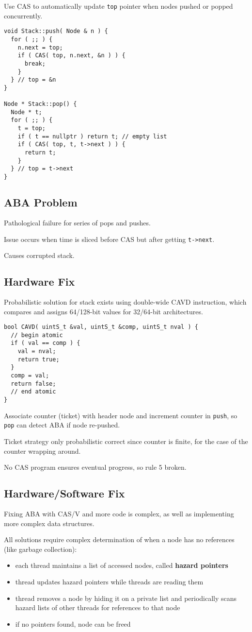 \documentclass[11pt]{article}
\begin{document}
Use CAS to automatically update \texttt{top} pointer when nodes pushed or popped concurrently.
\begin{verbatim}
void Stack::push( Node & n ) {
  for ( ;; ) {
    n.next = top;
    if ( CAS( top, n.next, &n ) ) {
      break;
    }
  } // top = &n
}

Node * Stack::pop() {
  Node * t;
  for ( ;; ) {
    t = top;
    if ( t == nullptr ) return t; // empty list
    if ( CAS( top, t, t->next ) ) {
      return t;
    }
  } // top = t->next
}
\end{verbatim}
\subsection{ABA Problem}
\label{sec:orgef9190d}
Pathological failure for series of pops and pushes.

Issue occurs when time is sliced before CAS but after getting \texttt{t->next}.

Causes corrupted stack.
\subsection{Hardware Fix}
\label{sec:org6620ee7}
Probabilistic solution for stack exists using double-wide CAVD instruction, which compares and assigns
64/128-bit values for 32/64-bit architectures.

\begin{verbatim}
bool CAVD( uintS_t &val, uintS_t &comp, uintS_t nval ) {
  // begin atomic
  if ( val == comp ) {
    val = nval;
    return true;
  }
  comp = val;
  return false;
  // end atomic
}
\end{verbatim}

Associate counter (ticket) with header node and increment counter in \texttt{push}, so \texttt{pop} can detect
ABA if node re-pushed.

Ticket strategy only probabilistic correct since counter is finite, for the case of the counter
wrapping around.

No CAS program ensures eventual progress, so rule 5 broken.
\subsection{Hardware/Software Fix}
\label{sec:orgd7edd2e}
Fixing ABA with CAS/V and more code is complex, as well as implementing more complex data structures.

All solutions require complex determination of when a node has no references (like garbage collection):
\begin{itemize}
\item each thread maintains a list of accessed nodes, called \textbf{hazard pointers}
\item thread updates hazard pointers while threads are reading them
\item thread removes a node by hiding it on a private list and periodically scans hazard lists of other
threads for references to that node
\item if no pointers found, node can be freed
\end{itemize}
\end{document}
